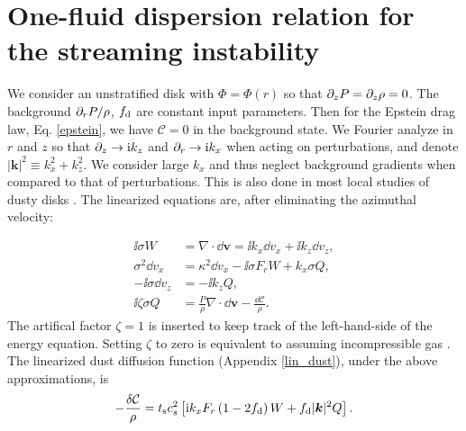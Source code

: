 \section{One-fluid dispersion relation for the streaming instability}\label{compressible_streaming}
We consider an unstratified disk with $\Phi = \Phi (r)$ so that $\partial_zP = \partial_z\rho =
0$. The background $\partial_rP/\rho$, $f_\mathrm{d}$ are constant
input parameters. Then for the Epstein drag law, Eq. \ref{epstein}, we
have $\mathcal{C}=0$ in the background state. 
We Fourier analyze in $r$ and $z$ so that $\partial_z\to \mathrm{i} k_z$ and
$\partial_r\to \mathrm{i} k_x$ when acting on perturbations, and denote $|\bm{k}|^2
\equiv k_x^2 + k_z^2$. We consider large $k_x$ and thus neglect background
gradients when compared to that of perturbations.  
 This is also done in most local studies of
dusty disks \citep[e.g.][]{youdin07b}.  
The linearized
equations are, after eliminating the azimuthal velocity: 

\begin{align}
  \ii \sigma W &=\nabla\cdot \dd \bm{ v} = \ii k_x \dd v_x + \ii k_z \dd v_z,\label{streaming_mass}\\
    \sigma^2 \dd v_x &= \kappa^2 \dd v_x - \ii \sigma F_r W +
    k_x\sigma Q,\label{streaming_vx}\\
  -\ii\sigma\dd v_z &= -\ii k_zQ,\label{streaming_vz}\\
\ii \zeta \sigma  Q & = \frac{P}{\rho} \nabla \cdot \dd\bm{v}   -
  \frac{\dd \mathcal{C}}{\rho}. 
\end{align}
The artifical factor $\zeta = 1$  is inserted to keep track of the
left-hand-side of the energy equation.  Setting $\zeta$ to zero is
equivalent to assuming incompressible gas \citep{jacquet11}. 
The linearized dust diffusion
function (Appendix \ref{lin_dust}), 
under the above approximations, is 
\begin{align}
-\frac{\delta \mathcal{C}}{\rho}  = t_\mathrm{s} c_s^2 \left[\mathrm{i} k_x F_r\left( 1-2f_\mathrm{d}\right)
  W + f_\mathrm{d} |\bm{k}|^2 Q\right]. \label{lin_drag_si}
\end{align}

